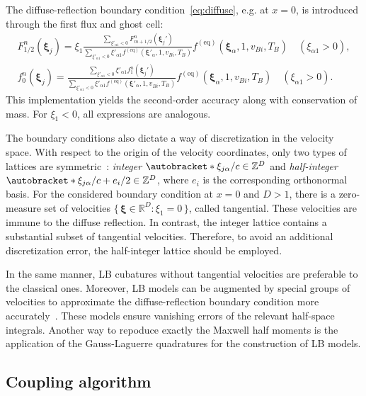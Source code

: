 \documentclass[]{elsarticle} %
\newcommand{\Set}[2]{\{\,{#1}:{#2}\,\}}
\DeclarePairedDelimiter\autobracket()       %
\newcommand{\br}[1]{\autobracket*{#1}}
\newcommand{\bxi}{\boldsymbol{\xi}}
\newcommand{\bxia}{\bxi_j}
\newcommand{\xiai}{\xi_{j \alpha}}
\newcommand{\equil}[1]{#1^\mathrm{(eq)}}
\begin{document}
{%
The diffuse-reflection boundary condition~\eqref{eq:diffuse}, e.g. at \(x=0\),
is introduced through the first flux and ghost cell:
\begin{gather}
    F_{1/2}^n(\bxia) = \displaystyle\xi_1\frac{\sum_{\xi'_{\alpha1}<0}F_{m+1/2}^n(\bxia')}
        {\sum_{\xi'_{\alpha1}<0}\xi'_{\alpha1}\equil{f}(\bxi'_\alpha,1,v_{Bi},T_B)}
        \equil{f}(\bxi_\alpha, 1, v_{Bi}, T_B) \quad (\xi_{\alpha1}>0), \label{eq:first_flux}\\
    f_0^n(\bxia) = \displaystyle\frac{\sum_{\xi'_{\alpha1}<0}\xi'_{\alpha1}f_1^n(\bxia')}
        {\sum_{\xi'_{\alpha1}<0}\xi'_{\alpha1}\equil{f}(\bxi'_\alpha,1,v_{Bi},T_B)}
        \equil{f}(\bxi_\alpha, 1, v_{Bi}, T_B) \quad (\xi_{\alpha1}>0). \label{eq:first_ghost}
\end{gather}
This implementation yields the second-order accuracy along with conservation of mass.
For \(\xi_1<0\), all expressions are analogous.

The boundary conditions also dictate a way of discretization in the velocity space.
With respect to the origin of the velocity coordinates, only two types of lattices are symmetric~\cite{Inamuro1990}:
\emph{integer} \(\br{\xiai/c} \in \mathbb{Z}^D\) and \emph{half-integer} \(\br{\xiai/c + e_i/2} \in \mathbb{Z}^D\),
where \(e_i\) is the corresponding orthonormal basis.
For the considered boundary condition at \(x=0\) and \(D>1\), there is a zero-measure set of velocities
\(\Set{\bxi\in\mathbb{R}^D}{\xi_1=0}\), called tangential.
These velocities are immune to the diffuse reflection.
In contrast, the integer lattice contains a substantial subset of tangential velocities.
Therefore, to avoid an additional discretization error, the half-integer lattice should be employed.

In the same manner, LB cubatures without tangential velocities are preferable to the classical ones.
Moreover, LB models can be augmented by special groups of velocities to approximate
the diffuse-reflection boundary condition more accurately~\cite{Feuchter2016}.
These models ensure vanishing errors of the relevant half-space integrals. Another  way to  repoduce exactly the Maxwell half moments  is the application of the Gauss-Laguerre quadratures for the construction of LB models\cite{Ambrus2014,Ambrus2016}.

\subsection{Coupling algorithm}\label{sec:numerics:coupling}

}
\end{document}
